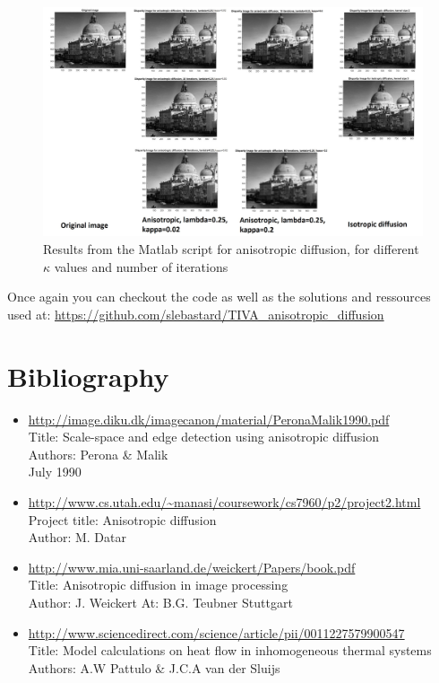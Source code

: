 \documentclass[12pt,a4paper]{article}
\begin{document}
\begin{figure}[h]
	\centering
	\includegraphics[scale=0.42]{anisotropic_diffusion.jpg}
	\caption{Results from the Matlab script for anisotropic diffusion, for different $\kappa$ values and number of iterations}	
\end{figure}

Once again you can checkout the code as well as the solutions and ressources used at: \url{https://github.com/slebastard/TIVA\_anisotropic\_diffusion}

\section{Bibliography}
\begin{itemize}
	\item \url{http://image.diku.dk/imagecanon/material/PeronaMalik1990.pdf}\\
	Title: Scale-space and edge detection using anisotropic diffusion\\
	Authors: Perona \& Malik\\
	July 1990
	\item \url{http://www.cs.utah.edu/~manasi/coursework/cs7960/p2/project2.html}\\
	Project title: Anisotropic diffusion\\
	Author: M. Datar
	\item \url{http://www.mia.uni-saarland.de/weickert/Papers/book.pdf}\\
	Title: Anisotropic diffusion in image processing\\
	Author: J. Weickert
	At: B.G. Teubner Stuttgart
	\item \url{http://www.sciencedirect.com/science/article/pii/0011227579900547}\\
	Title: Model calculations on heat flow in inhomogeneous thermal systems\\
	Authors: A.W Pattulo \& J.C.A van der Sluijs
\end{itemize}
\end{document}
